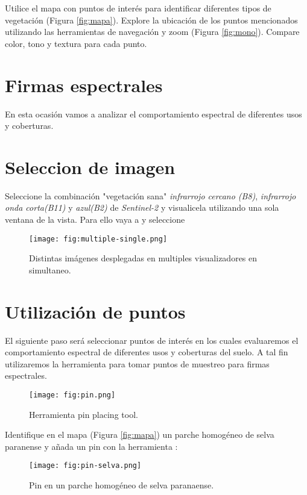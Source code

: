 Utilice el mapa con puntos de interés para identificar diferentes tipos de vegetación (Figura \ref{fig:mapa}). Explore la ubicación de los puntos mencionados utilizando las herramientas de navegación y zoom  (Figura \ref{fig:mono}). Compare color, tono y textura para cada punto.

\section{Firmas espectrales}


En esta ocasión vamos a analizar el comportamiento espectral de diferentes usos y coberturas.

\section{Seleccion de imagen}

Seleccione la combinación "vegetación sana" \emph{infrarrojo cercano (B8)}, \emph{infrarrojo onda corta(B11)} y \emph{azul(B2)} de \emph{Sentinel-2} y visualicela utilizando una sola ventana de la vista. Para ello vaya a  y seleccione 

\begin{figure}[h!]
    \centering
    \texttt{[image: fig:multiple-single.png]}
    \caption{Distintas imágenes desplegadas en multiples visualizadores en simultaneo.}
    \label{fig:multiples}
\end{figure}

\section{Utilización de puntos}

El siguiente paso será seleccionar puntos de interés en los cuales evaluaremos el comportamiento espectral de diferentes usos y coberturas del suelo. A tal fin utilizaremos la herramienta  para tomar puntos de muestreo para firmas espectrales.

\begin{figure}[h!]
    \centering
    \texttt{[image: fig:pin.png]}
    \caption{Herramienta pin placing tool.}
    \label{fig:pin}
\end{figure}

Identifique en el mapa (Figura \ref{fig:mapa}) un parche homogéneo de selva paranense y añada un pin con la herramienta :

\begin{figure}[h!]
    \centering
    \texttt{[image: fig:pin-selva.png]}
    \caption{Pin en un parche homogéneo de selva paranaense.}
    \label{fig:selva}
\end{figure}

